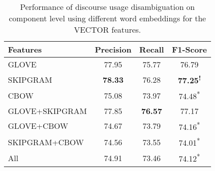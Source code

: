 \begin{table}[ht]
\centering
\begin{tabular}{|l|c|c|c|}
\hline

Features        &     Precision &     Recall &     F1-Score                 \\ \hline
GLOVE           &     77.95     &     75.77  &     76.79\textsuperscript{ } \\ \hline
SKIPGRAM        & \bf 78.33     &     76.28  & \bf 77.25\textsuperscript{!} \\ \hline
CBOW            &     75.08     &     73.97  &     74.48\textsuperscript{*} \\ \hline
GLOVE+SKIPGRAM  &     77.85     & \bf 76.57  &     77.17\textsuperscript{ } \\ \hline
GLOVE+CBOW      &     74.67     &     73.79  &     74.16\textsuperscript{*} \\ \hline
SKIPGRAM+CBOW   &     74.56     &     73.55  &     74.01\textsuperscript{*} \\ \hline
All             &     74.91     &     73.46  &     74.12\textsuperscript{*} \\ \hline

\end{tabular}
\caption{\label{t:recognition-vectors} Performance of discourse usage
disambiguation on component level using different word embeddings for
the VECTOR features. }
\end{table}
